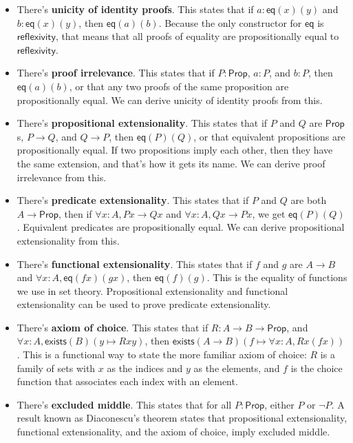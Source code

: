 \documentclass[11pt,paper=letter]{scrartcl}
\newcommand{\sf}{\mathsf}
\renewcommand{\lnot}{\neg}
\newcommand{\prop}{\mathsf{Prop}}
\begin{document}
\begin{itemize}
\item There's \textbf{unicity of identity proofs}. This states that if $a: \sf{eq}(x)(y)$ and $b: \sf{eq}(x)(y)$, then $\sf{eq}(a)(b)$. Because the only constructor for $\sf{eq}$ is $\sf{reflexivity}$, that means that all proofs of equality are propositionally equal to $\sf{reflexivity}$.

\item There's \textbf{proof irrelevance}. This states that if $P : \prop$, $a : P$, and $b : P$, then $\sf{eq}(a)(b)$, or that any two proofs of the same proposition are propositionally equal. We can derive unicity of identity proofs from this.

\item There's \textbf{propositional extensionality}. This states that if $P$ and $Q$ are $\prop$s, $P \to Q$, and $Q \to P$, then $\sf{eq}(P)(Q)$, or that equivalent propositions are propositionally equal. If two propositions imply each other, then they have the same extension, and that's how it gets its name. We can derive proof irrelevance from this.

\item There's \textbf{predicate extensionality}. This states that if $P$ and $Q$ are both $A \to \prop$, then if $\forall x : A, Px \to Qx$ and $\forall x : A, Qx \to Px$, we get $\sf{eq}(P)(Q)$. Equivalent predicates are propositionally equal. We can derive propositional extensionality from this.

\item There's \textbf{functional extensionality}. This states that if $f$ and $g$ are $A \to B$ and $\forall x: A, \sf{eq}(fx)(gx)$, then $\sf{eq}(f)(g)$. This is the equality of functions we use in set theory. Propositional extensionality and functional extensionality can be used to prove predicate extensionality.

\item There's \textbf{axiom of choice}. This states that if $R: A \to B \to \prop$, and $\forall x: A, \sf{exists}(B)(y \mapsto Rxy)$, then $\sf{exists}(A \to B)(f \mapsto \forall x: A, Rx(fx))$. This is a functional way to state the more familiar axiom of choice: $R$ is a family of sets with $x$ as the indices and $y$ as the elements, and $f$ is the choice function that associates each index with an element.

\item There's \textbf{excluded middle}. This states that for all $P: \prop$, either $P$ or $\lnot P$. A result known as Diaconescu's theorem states that propositional extensionality, functional extensionality, and the axiom of choice, imply excluded middle.
\end{itemize}
\end{document}
